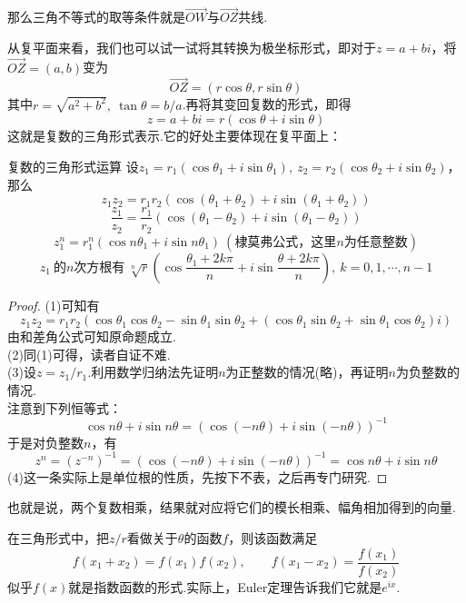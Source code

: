 \documentclass[lang=cn, zihao=5]{elegantbook}
\newcommand{\xl}[1]{\overrightarrow{#1}}
\newcommand{\ssb}[1]{\left( #1 \right)}
\begin{document}
那么三角不等式的取等条件就是$\xl{OW}$与$\xl{OZ}$共线.

从复平面来看，我们也可以试一试将其转换为极坐标形式，即对于$z=a+bi $，将$\xl{OZ}=(a,b)$变为$$\xl{OZ} = (r \cos \theta ,r \sin \theta )$$
其中$r=\sqrt{a^2+b^2},~\tan \theta = b/a$.再将其变回复数的形式，即得$$z = a+bi = r(\cos \theta + i \sin \theta)$$
这就是复数的三角形式表示.它的好处主要体现在复平面上：

\begin{proposition}{复数的三角形式运算}
	设$z_1=r_1(\cos \theta _1+ i \sin \theta _1),~z_2=r_2(\cos \theta _2+ i \sin \theta _2)$，那么
	$$z_1z_2 = r_1r_2\ssb{ \cos (\theta _1 + \theta _2) + i \sin (\theta _1 + \theta _2) }$$
	$$\frac{z_1}{z_2} = \frac{r_1}{r_2} \ssb{ \cos (\theta _1 - \theta _2) + i \sin (\theta _1 - \theta _2) }$$
	$$z_1^n = r_1^n \ssb{ \cos n\theta _1 + i \sin n\theta _1 }~(\textit{棣莫弗公式，这里$n$为任意整数})$$
	$$z_1~\textit{的$n$次方根有}~ \sqrt[n]{r} \ssb{ \cos \frac{\theta _1+2k\pi}{n} + i \sin \frac{\theta +2k\pi}{n} },~k=0,1,\cdots ,n-1$$
\end{proposition}
\begin{proof}
	(1)可知有$$z_1z_2 = r_1r_2\ssb{ \cos \theta _1 \cos \theta _2 - \sin \theta _1 \sin \theta _2 + (\cos \theta _1 \sin \theta _2 + \sin \theta _1 \cos \theta _2) i }$$
	由和差角公式可知原命题成立. \\
	(2)同(1)可得，读者自证不难. \\
	(3)设$z=z_1/r_1$.利用数学归纳法先证明$n$为正整数的情况(略)，再证明$n$为负整数的情况. \\
	注意到下列恒等式：$$\cos n\theta + i \sin n\theta = \ssb{\cos (-n\theta ) + i \sin (-n\theta)}^{-1}$$
	于是对负整数$n$，有$$z^n = (z^{-n})^{-1} = \ssb{\cos (-n\theta ) + i \sin (-n\theta)}^{-1} = \cos n\theta + i \sin n\theta$$
	(4)这一条实际上是单位根的性质，先按下不表，之后再专门研究.
\end{proof}

也就是说，两个复数相乘，结果就对应将它们的模长相乘、幅角相加得到的向量.

在三角形式中，把$z/r$看做关于$\theta$的函数$f$，则该函数满足$$f(x_1+x_2) = f(x_1)f(x_2),\qquad f(x_1-x_2)=\frac{f(x_1)}{f(x_2)}$$
似乎$f(x)$就是指数函数的形式.实际上，Euler定理告诉我们它就是$e^{i x}$.
\end{document}
